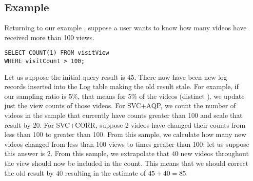 \subsection{Example}
Returning to our example , suppose a user wants to know how many videos have received more than 100 views.
\begin{lstlisting}[basicstyle={\scriptsize}]
SELECT COUNT(1) FROM visitView 
WHERE visitCount > 100;
\end{lstlisting}
Let us suppose the initial query result is $45$.
There now have been new log records inserted into the Log table making the old result stale.
For example, if our sampling ratio is 5\%, that means for 5\% of the videos (distinct ), we update just the view counts of those videos.
For SVC+AQP, we count the number of videos in the sample that currently have counts greater than 100 and scale that result by 20.
For SVC+CORR, suppose 2 videos have changed their counts from less than 100 to greater than 100.
From this sample, we calculate how many new videos changed from less than 100 views to times greater than 100; let us suppose this answer is $2$.
From this sample, we extrapolate that $40$ new videos throughout the view should now be included in the count.
This means that we should correct the old result by $40$ resulting in the estimate of $45+40 = 85$.

\iffalse
\vspace{-.25em}
\subsection{Select Queries}
In \svc, we also explore how to extend this correction procedure to Select queries.
Suppose, we have a Select query with a predicate:
\begin{lstlisting} [mathescape]
SELECT $*$ FROM View WHERE Condition(A);
\end{lstlisting}

We first run the Select query on the stale view, and this returns a set of rows.
This result has three types of data error: rows that are missing, rows that are falsely included, and rows whose values are incorrect.

As in the \sumfunc, \countfunc, and \avgfunc query case, we can apply the query to the sample of the up-to-date view.
From this sample, using our lineage defined earlier, we can quickly identify which rows were added, updated, and deleted.
For the updated rows in the sample, we overwrite the out-of-date rows in the stale query result.
For the new rows, we take a union of the sampled selection and the updated stale selection.
For the missing rows, we remove them from the stale selection.
To quantify the approximation error, we can rewrite the Select query as \countfunc to get an estimate of number of rows that were updated, added, or deleted (thus three ``confidence'' intervals). 
\fi


